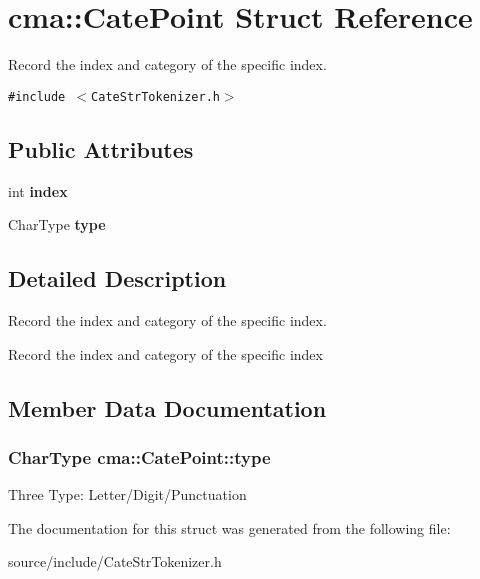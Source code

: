 \section{cma::CatePoint Struct Reference}
\label{structcma_1_1CatePoint}
Record the index and category of the specific index.  


{\tt \#include $<$CateStrTokenizer.h$>$}

\subsection*{Public Attributes}
\begin{CompactItemize}
\item 
int \textbf{index}\label{structcma_1_1CatePoint_4d5fb8b0c7028e57ef179c0630f0eee7}

\item 
CharType {\bf type}
\end{CompactItemize}


\subsection{Detailed Description}
Record the index and category of the specific index. 

Record the index and category of the specific index 

\subsection{Member Data Documentation}
\subsubsection{\setlength{\rightskip}{0pt plus 5cm}CharType {\bf cma::CatePoint::type}}\label{structcma_1_1CatePoint_1eddb8c6760d5cd21d5f15b1ee8eb01f}


Three Type: Letter/Digit/Punctuation 

The documentation for this struct was generated from the following file:\begin{CompactItemize}
\item 
source/include/CateStrTokenizer.h\end{CompactItemize}
